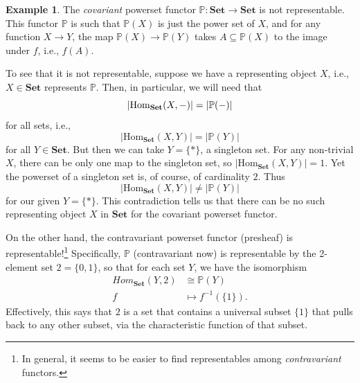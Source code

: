 \documentclass[a4paper]{book}
\theoremstyle{definition}
\newtheorem{example}{Example}[section]
\theoremstyle{definition}
\theoremstyle{definition}
\theoremstyle{theorem}
\theoremstyle{definition}
\begin{document}
\begin{example}
	The \textit{covariant} powerset functor $\mathbb{P}: \textbf{Set} \rightarrow \textbf{Set}$ is not representable. This functor $\mathbb{P}$ is such that $\mathbb{P}(X)$ is just the power set of $X$, and for any function $X \rightarrow Y$, the map $\mathbb{P}(X) \rightarrow \mathbb{P}(Y)$ takes $A \subseteq  \mathbb{P}(X)$ to the image under $f$, i.e., $f(A)$. \par 
	To see that it is not representable, suppose we have a representing object $X$, i.e., $X \in \textbf{Set}$ represents $\mathbb{P}$. Then, in particular, we will need that 
	\begin{equation*}
	|\text{Hom}_{\textbf{Set}}(X, \--)| = |\mathbb{P}(\--)|
	\end{equation*}
	for all sets, i.e., 
	\begin{equation*}
	|\text{Hom}_{\textbf{Set}}(X, Y)| = |\mathbb{P}(Y)|
	\end{equation*}
	for all $Y \in \textbf{Set}$. But then we can take $Y = \{*\}$, a singleton set. For any non-trivial $X$, there can be only one map to the singleton set, so $|\text{Hom}_{\textbf{Set}}(X, Y)| = 1$. Yet the powerset of a singleton set is, of course, of cardinality $2$. Thus 
	\begin{equation*}
	|\text{Hom}_{\textbf{Set}}(X, Y)| \neq |\mathbb{P}(Y)|
	\end{equation*} 
	for our given $Y = \{*\}$. This contradiction tells us that there can be no such representing object $X$ in $\textbf{Set}$ for the covariant powerset functor. \par 
	On the other hand, the contravariant powerset functor (presheaf) is representable!\footnote{In general, it seems to be easier to find representables among \textit{contravariant} functors.}  
	Specifically, $\mathbb{P}$ (contravariant now) is representable by the 2-element set $2 = \{0,1\}$, so that for each set $Y$, we have the isomorphism 
	\begin{align*}
	Hom_\textbf{Set}(Y, 2) & \cong \mathbb{P}(Y) \\
	f & \mapsto f^{-1}(\{1\}).
	\end{align*} 
	Effectively, this says that $2$ is a set that contains a universal subset $\{1\}$ that pulls back to any other subset, via the characteristic function of that subset. 
\end{example}
\end{document}
